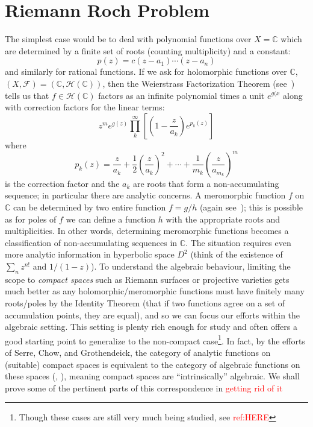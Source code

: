\documentclass{book}
\newcommand{\C}{{\mathbb{C}}}
\newcommand{\CF}{{\mathcal{F}}}
\newcommand{\CH}{{\mathcal{H}}}
\newcommand{\CM}{{\mathcal{M}}}
\newcommand{\CO}{{\mathcal{O}}}
\begin{document}
\section{Riemann Roch Problem}

The simplest case would be to deal with polynomial functions over $X = \C$ which are determined by a finite
set of roots (counting multiplicity) and a constant:
\[
  p(z) = c(z-a_1)\cdots (z-a_n)
\]
and similarly for rational functions.
If we ask for holomorphic
functions over $\C$, $(X,\CF) = (\C, \CH(\C))$, then the Weierstrass Factorization Theorem
(see~\cite[section~4.2]{NateComplexAnalysis}) tells us that $f \in \CH(\C)$ factors as an infinite polynomial
times a unit $e^{g(x}$ along with correction factors for the linear terms:
\[
  z^m e^{g(z)}\prod_k^\infty \left[ \left( 1- \frac{z}{a_k} \right)e^{p_k(z)} \right]
\]
where
\[
  p_k(z) =  \frac{z}{a_k} + \frac{1}{2} \left( \frac{z}{a_k} \right)^2 + \cdots + \frac{1}{m_k} \left( \frac{z}{a_{m_k}} \right)^m
\]
is the correction factor and the $a_k$ are roots that form a non-accumulating sequence; in particular there are analytic concerns.
A meromorphic function $f$ on $\C$ can be determined by two entire function $f = g/h$ (again
see~\cite[section~4.2]{NateComplexAnalysis}); this is possible as for poles of $f$ we can define a function $h$ with the
appropriate roots and multiplicities. In other words, determining meromorphic functions becomes
a classification of non-accumulating sequences in $\C$. The situation requires even more analytic information in hyperbolic
space $D^2$ (think of the existence of $\sum_n z^{n!}$ and $1/(1-z)$). To understand the algebraic behaviour, limiting the scope to
\emph{compact spaces} such as Riemann surfaces or projective varieties gets much better as any holomorphic/meromorphic
functions must have finitely many roots/poles by the Identity Theorem (that if two functions agree on a set
of accumulation points, they are equal), and so we can focus our efforts within the algebraic setting. This
setting is plenty rich enough for study and often offers a good starting point to generalize to the
non-compact case\footnote{Though these cases are still very much being studied, see
\textcolor{red}{ref:HERE}}. In fact, by the efforts of Serre, Chow, and Grothendeick, the category of analytic
functions on (suitable) compact spaces is equivalent to the category of algebraic functions on these spaces
(\cite{hallGAGATheorems2022}, \cite{chowCompactComplexAnalytic1949}),
meaning compact spaces are ``intrinsically'' algebraic. We shall prove some of the pertinent parts of this
correspondence in \textcolor{red}{getting rid of it}
\end{document}
